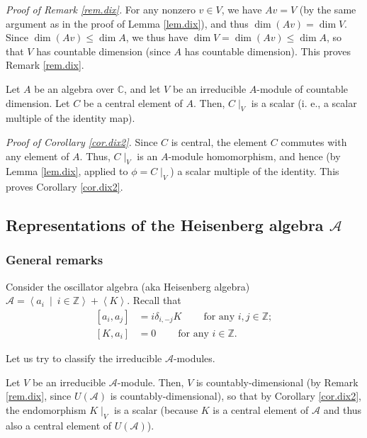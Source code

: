 \documentclass[etingof-lie.tex]{subfiles}
\begin{document}
\textit{Proof of Remark \ref{rem.dix}.} For any nonzero $v\in V$, we have
$Av=V$ (by the same argument as in the proof of Lemma \ref{lem.dix}), and thus
$\dim\left(  Av\right)  =\dim V$. Since $\dim\left(  Av\right)  \leq\dim A$,
we thus have $\dim V=\dim\left(  Av\right)  \leq\dim A$, so that $V$ has
countable dimension (since $A$ has countable dimension). This proves Remark
\ref{rem.dix}.

\begin{corollary}
\label{cor.dix2}Let $A$ be an algebra over $\mathbb{C}$, and let $V$ be an
irreducible $A$-module of countable dimension. Let $C$ be a central element of
$A$. Then, $C\mid_{V}$ is a scalar (i. e., a scalar multiple of the identity map).
\end{corollary}

\textit{Proof of Corollary \ref{cor.dix2}.} Since $C$ is central, the element
$C$ commutes with any element of $A$. Thus, $C\mid_{V}$ is an $A$-module
homomorphism, and hence (by Lemma \ref{lem.dix}, applied to $\phi=C\mid_{V}$)
a scalar multiple of the identity. This proves Corollary \ref{cor.dix2}.

\subsection{Representations of the Heisenberg algebra
\texorpdfstring{$\mathcal{A}$}{A}}

\subsubsection{General remarks}

Consider the oscillator algebra (aka Heisenberg algebra) $\mathcal{A}%
=\left\langle a_{i}\ \mid\ i\in\mathbb{Z}\right\rangle +\left\langle
K\right\rangle $. Recall that%
\begin{align*}
\left[  a_{i},a_{j}\right]   &  =i\delta_{i,-j}K\ \ \ \ \ \ \ \ \ \ \text{for
any }i,j\in\mathbb{Z};\\
\left[  K,a_{i}\right]   &  =0\ \ \ \ \ \ \ \ \ \ \text{for any }%
i\in\mathbb{Z}.
\end{align*}


Let us try to classify the irreducible $\mathcal{A}$-modules.

Let $V$ be an irreducible $\mathcal{A}$-module. Then, $V$ is
countably-dimensional (by Remark \ref{rem.dix}, since $U\left(  \mathcal{A}%
\right)  $ is countably-dimensional), so that by Corollary \ref{cor.dix2}, the
endomorphism $K\mid_{V}$ is a scalar (because $K$ is a central element of
$\mathcal{A}$ and thus also a central element of $U\left(  \mathcal{A}\right)
$).
\end{document}
